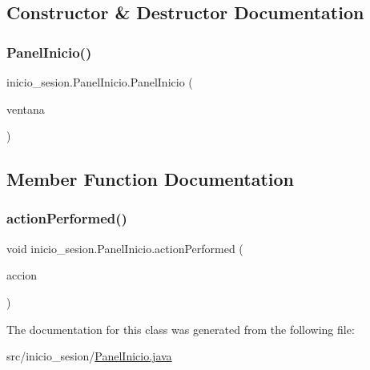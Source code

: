 \subsection{Constructor \& Destructor Documentation}
\mbox{\label{classinicio__sesion_1_1_panel_inicio_a52785308392082e5236bd7baa440e5ee}} 
\subsubsection{\texorpdfstring{Panel\+Inicio()}{PanelInicio()}}
{\footnotesize\ttfamily inicio\+\_\+sesion.\+Panel\+Inicio.\+Panel\+Inicio (\begin{DoxyParamCaption}\item[{J\+Frame}]{ventana }\end{DoxyParamCaption})}



\subsection{Member Function Documentation}
\mbox{\label{classinicio__sesion_1_1_panel_inicio_adb604bc478a50eb56504e5f411f28431}} 
\subsubsection{\texorpdfstring{action\+Performed()}{actionPerformed()}}
{\footnotesize\ttfamily void inicio\+\_\+sesion.\+Panel\+Inicio.\+action\+Performed (\begin{DoxyParamCaption}\item[{Action\+Event}]{accion }\end{DoxyParamCaption})}



The documentation for this class was generated from the following file\+:\begin{DoxyCompactItemize}
\item 
src/inicio\+\_\+sesion/\mbox{\hyperlink{_panel_inicio_8java}{Panel\+Inicio.\+java}}\end{DoxyCompactItemize}
